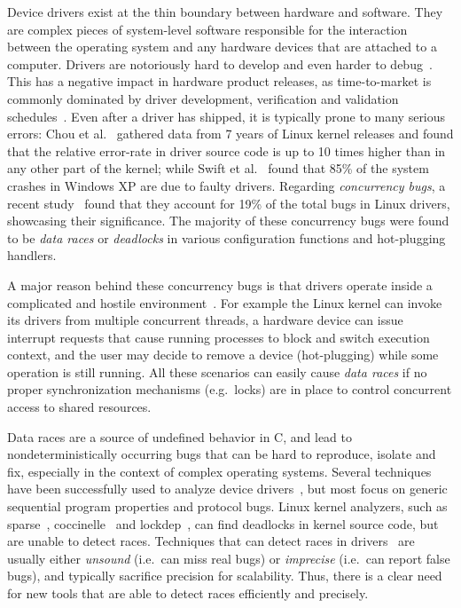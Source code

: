 Device drivers exist at the thin boundary between hardware and software. They are complex pieces of system-level software responsible for the interaction between the operating system and any hardware devices that are attached to a computer. Drivers are notoriously hard to develop and even harder to debug~\cite{corbet2005linux}. This has a negative impact in hardware product releases, as time-to-market is commonly dominated by driver development, verification and validation schedules~\cite{yavatkar2012era}.
%
Even after a driver has shipped, it is typically prone to many serious errors: Chou et al.~\cite{chou2001empirical} gathered data from 7 years of Linux kernel releases and found that the relative error-rate in driver source code is up to 10 times higher than in any other part of the kernel; while Swift et al.~\cite{Swift2003windowsxp} found that 85\% of the system crashes in Windows XP are due to faulty drivers. Regarding \emph{concurrency bugs}, a recent study~\cite{ryzhyk2009dingo} found that they account for 19\% of the total bugs in Linux drivers, showcasing their significance. The majority of these concurrency bugs were found to be \emph{data races} or \emph{deadlocks} in various configuration functions and hot-plugging handlers.

A major reason behind these concurrency bugs is that drivers operate inside a complicated and hostile environment~\cite{corbet2005linux}. For example the Linux kernel can invoke its drivers from multiple concurrent threads, a hardware device can issue interrupt requests that cause running processes to block and switch execution context, and the user may decide to remove a device (hot-plugging) while some operation is still running. All these scenarios can easily cause \emph{data races} if no proper synchronization mechanisms (e.g.\ locks) are in place to control concurrent access to shared resources.

Data races are a source of undefined behavior in C, and lead to nondeterministically occurring bugs that can be hard to reproduce, isolate and fix, especially in the context of complex operating systems.
%
Several techniques have been successfully used to analyze device drivers~\cite{ball2006thorough, clarke2004predicate, engler2000checking, henzinger2002temporal, cook2006termination, kuznetsov2010testing, renzelmann2012symdrive, lal2012corral}, but most focus on generic sequential program properties and protocol bugs. Linux kernel analyzers, such as sparse~\cite{corbet2004sparse}, coccinelle~\cite{padioleau2008doc} and lockdep~\cite{corbet2006lock}, can find deadlocks in kernel source code, but are unable to detect races. Techniques that can detect races in drivers~\cite{qadeer2004kiss, pratikakis2006locksmith, voung2007relay, lal2012corral} are usually either \emph{unsound} (i.e.\ can miss real bugs) or \emph{imprecise} (i.e.\ can report false bugs), and typically sacrifice precision for scalability. Thus, there is a clear need for new tools that are able to detect races efficiently and precisely.

